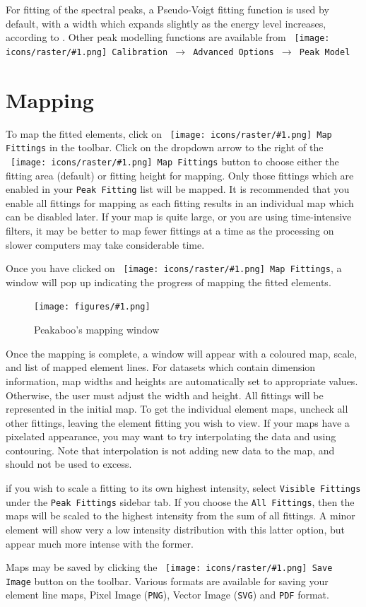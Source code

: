 \documentclass[article,twoside,11pt]{report}
\newcommand{\command}[1]{\texttt{#1}}
\newcommand{\icon}[1]{\texttt{[image: icons/raster/\#1.png]}}
\newcommand{\button}[2]{\ \command{\icon{#1} #2}}
\newcommand{\menu}[0]{$\rightarrow$}
\newcommand{\screenshot}[2]{%
\begin{figure}[h!]
\centering\texttt{[image: figures/\#1.png]}
\caption{#2}
\end{figure}
}
\newcommand{\tocchapter}[1]{\cleardoublepage\chapter*{#1}\addcontentsline{toc}{chapter}{#1}}
\begin{document}
For fitting of the spectral peaks, a Pseudo-Voigt fitting function is used by default, with a width which expands slightly as the energy level increases, according to \cite{xray-handbook p282}. Other peak modelling functions are available from \command{\button{energy-menu}{Calibration} \menu\ Advanced Options \menu\ Peak Model}


\tocchapter{Mapping}

To map the fitted elements, click on \button{map}{Map Fittings} in the toolbar. 
Click on the dropdown arrow to the right of the \button{map}{Map Fittings} button to 
choose either the fitting area (default) or fitting height for mapping. Only those 
fittings which are enabled in your \command{Peak Fitting} list will be mapped. It 
is recommended that you enable all fittings for mapping as each fitting results in 
an individual map which can be disabled later. If your map is quite large, or you 
are using time-intensive filters, it may be better to map fewer fittings at a 
time as the processing on slower computers may take considerable time.

Once you have clicked on \button{map}{Map Fittings}, a window will pop up indicating the
progress of mapping the fitted elements.

\screenshot{map-window}{Peakaboo's mapping window}

Once the mapping is complete, a window will appear with a coloured map, scale, and 
list of mapped element lines. For datasets which contain dimension information, map 
widths and heights are automatically set to appropriate values. Otherwise, the user 
must adjust the width and height. All fittings will be represented in the initial map. 
To get the individual element maps, uncheck all other fittings, leaving the element 
fitting you wish to view. If your maps have a pixelated appearance, you may want to 
try interpolating the data and using contouring. Note that interpolation is not adding 
new data to the map, and should not be used to excess.

if you wish to scale a fitting to its own highest intensity, select \command{Visible Fittings}
under the \command{Peak Fittings} sidebar tab. If you choose the 
\command{All Fittings}, then the maps will be scaled to the highest intensity from 
the sum of all fittings. A minor element will show very a low intensity 
distribution with this latter option, but appear much more intense with the former.

Maps may be saved by clicking the \button{device-camera}{Save Image} button on the toolbar.
Various formats are available for saving your element line maps, 
Pixel Image (\command{PNG}), Vector Image (\command{SVG}) and \command{PDF} format.
\end{document}
